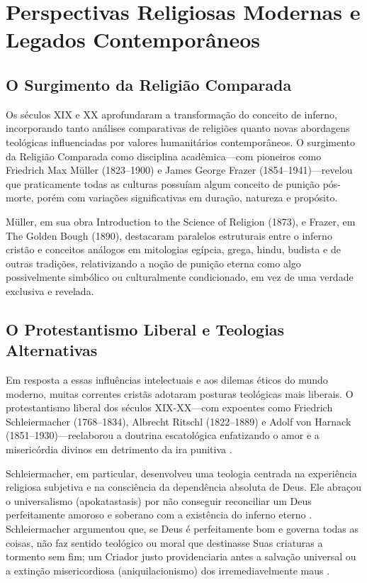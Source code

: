\section{Perspectivas Religiosas Modernas e Legados Contemporâneos}

\subsection{O Surgimento da Religião Comparada}

Os séculos XIX e XX aprofundaram a transformação do conceito de inferno, incorporando tanto análises comparativas de religiões quanto novas abordagens teológicas influenciadas por valores humanitários contemporâneos. O surgimento da Religião Comparada como disciplina acadêmica---com pioneiros como Friedrich Max Müller (1823--1900) e James George Frazer (1854--1941)---revelou que praticamente todas as culturas possuíam algum conceito de punição pós-morte, porém com variações significativas em duração, natureza e propósito.

Müller, em sua obra Introduction to the Science of Religion (1873), e Frazer, em The Golden Bough (1890), destacaram paralelos estruturais entre o inferno cristão e conceitos análogos em mitologias egípcia, grega, hindu, budista e de outras tradições, relativizando a noção de punição eterna como algo possivelmente simbólico ou culturalmente condicionado, em vez de uma verdade exclusiva e revelada.

\subsection{O Protestantismo Liberal e Teologias Alternativas}

Em resposta a essas influências intelectuais e aos dilemas éticos do mundo moderno, muitas correntes cristãs adotaram posturas teológicas mais liberais. O protestantismo liberal dos séculos XIX-XX---com expoentes como Friedrich Schleiermacher (1768--1834), Albrecht Ritschl (1822--1889) e Adolf von Harnack (1851--1930)---reelaborou a doutrina escatológica enfatizando o amor e a misericórdia divinos em detrimento da ira punitiva \cite{Welch1972}.

Schleiermacher, em particular, desenvolveu uma teologia centrada na experiência religiosa subjetiva e na consciência da dependência absoluta de Deus. Ele abraçou o universalismo (apokatastasis) por não conseguir reconciliar um Deus perfeitamente amoroso e soberano com a existência do inferno eterno \cite{Schleiermacher1821}. Schleiermacher argumentou que, se Deus é perfeitamente bom e governa todas as coisas, não faz sentido teológico ou moral que destinasse Suas criaturas a tormento sem fim; um Criador justo providenciaria antes a salvação universal ou a extinção misericordiosa (aniquilacionismo) dos irremediavelmente maus \cite{Thandeka1995}.

